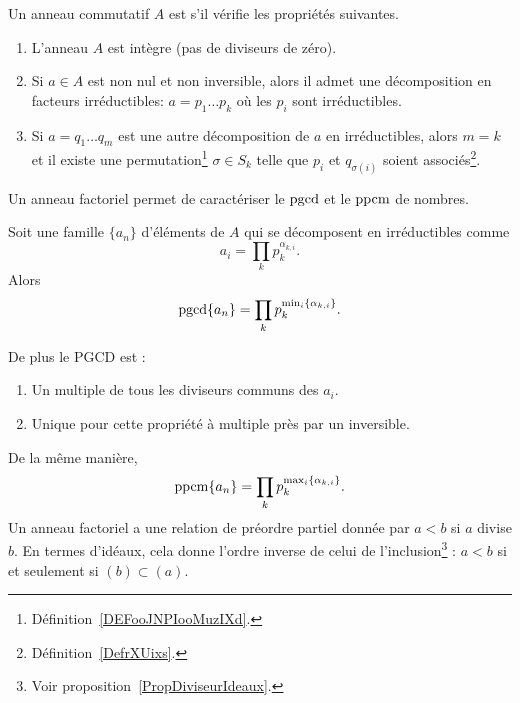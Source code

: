 \begin{definition}        \label{DEFooVCATooPJGWKq}
    Un anneau commutatif \( A\) est  s'il vérifie les propriétés suivantes.
    \begin{enumerate}
        \item
            L'anneau \( A\) est intègre (pas de diviseurs de zéro).
        \item
            Si \( a\in A\) est non nul et non inversible, alors il admet une décomposition en facteurs irréductibles: \( a=p_1\ldots p_k\) où les \( p_i\) sont irréductibles.
        \item
            Si \( a=q_1\ldots q_m\) est une autre décomposition de \( a\) en irréductibles, alors \( m=k\) et il existe une permutation\footnote{Définition~\ref{DEFooJNPIooMuzIXd}.} \( \sigma\in S_k\) telle que \( p_i\) et \( q_{\sigma(i)}\) soient associés\footnote{Définition~\ref{DefrXUixs}.}.
    \end{enumerate}
\end{definition}

Un anneau factoriel permet de caractériser le \( \operatorname{pgcd}\) et le \( \operatorname{ppcm}\) de nombres.

\begin{proposition}
Soit une famille \( \{ a_n \}\) d'éléments de \( A\) qui se décomposent en irréductibles comme
\begin{equation}
    a_i=\prod_k p_k^{\alpha_{k,i}}.
\end{equation}
Alors
\begin{equation}
    \operatorname{pgcd}\{ a_n \}=\prod_k p_k^{\min_i\{ \alpha_{k,i} \}}.
\end{equation}

De plus le PGCD est :
\begin{enumerate}
    \item
        Un multiple de tous les diviseurs communs des \( a_i\).
    \item
        Unique pour cette propriété à multiple près par un inversible.
\end{enumerate}

\end{proposition}

De la même manière,
\begin{equation}
    \operatorname{ppcm}\{ a_n \}=\prod_kp_k^{\max_i\{ \alpha_{k,i} \}}.
\end{equation}
Un anneau factoriel a une relation de préordre partiel donnée par \( a<b\) si \( a\) divise \( b\). En termes d'idéaux, cela donne l'ordre inverse de celui de l'inclusion\footnote{Voir proposition~\ref{PropDiviseurIdeaux}.} : \( a<b\) si et seulement si \( (b)\subset (a)\).

